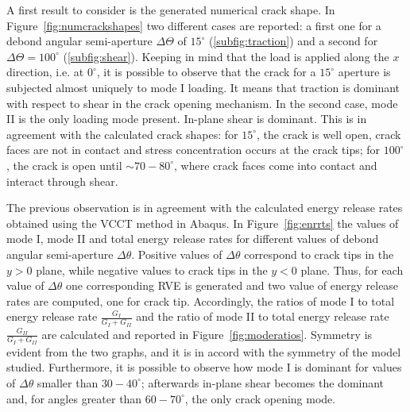 \documentclass[a4paper]{jpconf}
\begin{document}
A first result to consider is the generated numerical crack shape. In Figure~\ref{fig:numcrackshapes} two different cases are reported: a first one for a debond angular semi-aperture $\Delta\Theta$ of $15^{\circ}$ (\ref{subfig:traction}) and a second for $\Delta\Theta=100^{\circ}$ (\ref{subfig:shear}). Keeping in mind that the load is applied along the $x$ direction, i.e. at $0^{\circ}$, it is possible to observe that the crack for a $15^{\circ}$ aperture is subjected almost uniquely to mode I loading. It means that traction is dominant with respect to shear in the crack opening mechanism. In the second case, mode II is the only loading mode present. In-plane shear is dominant. This is in agreement with the calculated crack shapes: for $15^{\circ}$, the crack is well open, crack faces are not in contact and stress concentration occurs at the crack tips; for $100^{\circ}$, the crack is open until $\sim70-80^{\circ}$, where crack faces come into contact and interact through shear.\par
The previous observation is in agreement with the calculated energy release rates obtained using the VCCT method in Abaqus. In Figure~\ref{fig:enrrts} the values of mode I, mode II and total energy release rates for different values of debond angular semi-aperture $\Delta\theta$. Positive values of $\Delta\theta$ correspond to crack tips in the $y>0$ plane, while negative values to crack tips in the $y<0$ plane. Thus, for each value of $\Delta\theta$ one corresponding RVE is generated and two value of energy release rates are computed, one for crack tip. Accordingly, the ratios of mode I to total energy release rate $\frac{G_{I}}{G_{I}+G_{II}}$ and the ratio of mode II to total energy release rate $\frac{G_{II}}{G_{I}+G_{II}}$ are calculated and reported in Figure~\ref{fig:moderatios}. Symmetry is evident from the two graphs, and it is in accord with the symmetry of the model studied. Furthermore, it is possible to observe how mode I is dominant for values of $\Delta\theta$ smaller than $30-40^{\circ}$; afterwards in-plane shear becomes the dominant and, for angles greater than $60-70^{\circ}$, the only crack opening mode.
\end{document}
